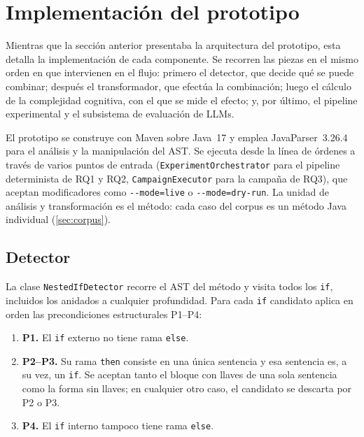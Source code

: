 
\section{Implementación del prototipo}
\label{sec:implementacion}

Mientras que la sección anterior presentaba la arquitectura del prototipo,
esta detalla la implementación de cada componente.
Se recorren las piezas en el mismo orden en que intervienen en el flujo:
primero el detector, que decide qué se puede combinar; después el
transformador, que efectúa la combinación; luego el cálculo de la
complejidad cognitiva, con el que se mide el efecto; y, por último, el
pipeline experimental y el subsistema de evaluación de LLMs.

El prototipo se construye con Maven sobre Java~17 y emplea JavaParser~3.26.4
para el análisis y la manipulación del AST. Se ejecuta desde la línea de
órdenes a través de varios puntos de entrada (\texttt{ExperimentOrchestrator}
para el pipeline determinista de RQ1 y RQ2, \texttt{CampaignExecutor} para la
campaña de RQ3), que aceptan modificadores como \lstinline|--mode=live| o
\lstinline|--mode=dry-run|. La unidad de análisis y transformación es el
método: cada caso del corpus es un método Java individual
(\autoref{sec:corpus}).

\subsection{Detector}

La clase \texttt{NestedIfDetector} recorre el AST del método y visita todos
los \lstinline|if|, incluidos los anidados a cualquier profundidad. Para
cada \lstinline|if| candidato aplica en orden las precondiciones estructurales
P1--P4:

\begin{enumerate}
    \item \textbf{P1.} El \lstinline|if| externo no tiene rama \lstinline|else|.

    \item \textbf{P2--P3.} Su rama \lstinline|then| consiste en una única
    sentencia y esa sentencia es, a su vez, un \lstinline|if|. Se aceptan
    tanto el bloque con llaves de una sola sentencia como la forma sin
    llaves; en cualquier otro caso, el candidato se descarta por P2 o P3.

    \item \textbf{P4.} El \lstinline|if| interno tampoco tiene rama
    \lstinline|else|.
\end{enumerate}

